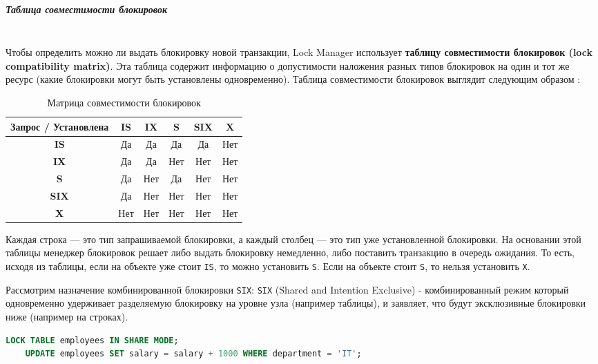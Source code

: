 \subparagraph{Таблица совместимости блокировок} ~\\
 Чтобы определить можно ли выдать блокировку новой транзакции, Lock Manager использует \textbf{таблицу совместимости блокировок (lock compatibility matrix)}. Эта таблица содержит информацию о допустимости наложения разных типов блокировок на один и тот же ресурс (какие блокировки могут быть установлены одновременно). Таблица совместимости блокировок выглядит следующим образом \autocite{Silberschatz}:
 
 \begin{table}[H]
    \centering
    \begin{tabular}{|c|c|c|c|c|c|}
        \hline
        \textbf{Запрос / Установлена} & \textbf{IS} & \textbf{IX} & \textbf{S} & \textbf{SIX} & \textbf{X} \\
        \hline
        \textbf{IS} & Да & Да & Да & Да & Нет \\
        \hline
        \textbf{IX} & Да & Да & Нет & Нет & Нет \\
        \hline
        \textbf{S} & Да & Нет & Да & Нет & Нет \\
        \hline
        \textbf{SIX} & Да & Нет & Нет & Нет & Нет \\
        \hline
        \textbf{X} & Нет & Нет & Нет & Нет & Нет \\
        \hline
    \end{tabular}
    \caption{Матрица совместимости блокировок}
 \end{table}

 Каждая строка — это тип запрашиваемой блокировки, а каждый столбец — это тип уже установленной блокировки.
 На основании этой таблицы менеджер блокировок решает либо выдать блокировку немедленно, либо поставить транзакцию в очередь ожидания.
 То есть, исходя из таблицы, если на объекте уже стоит \texttt{IS}, то можно установить \texttt{S}. Если на объекте стоит \texttt{S}, то нельзя установить \texttt{X}.

 Рассмотрим назначение комбинированной блокировки \texttt{SIX}:
 \texttt{SIX} (Shared and Intention Exclusive) - комбинированный режим который одновременно удерживает разделяемую блокировку на уровне узла (например таблицы), и заявляет, что будут эксклюзивные блокировки ниже (например на строках).
 \begin{lstlisting}[language=SQL]
    LOCK TABLE employees IN SHARE MODE;
    UPDATE employees SET salary = salary + 1000 WHERE department = 'IT';   
 \end{lstlisting}

